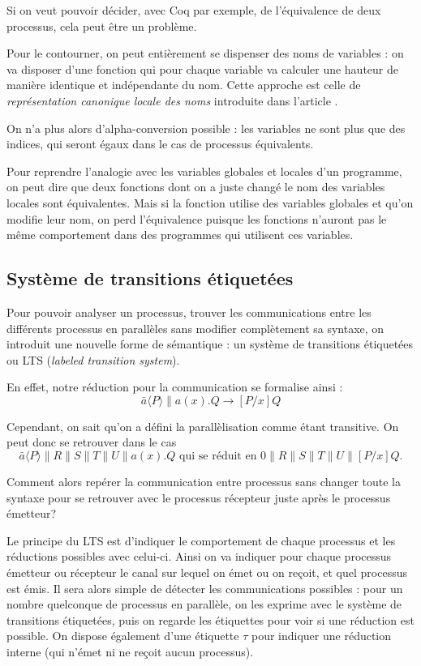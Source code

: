 \documentclass[11pt]{article}
\begin{document}
Si on veut pouvoir décider, avec Coq par exemple, de l'équivalence de deux processus, cela peut être un problème.

Pour le contourner, on peut entièrement se dispenser des noms de variables : on va disposer d'une fonction qui pour chaque variable va calculer une hauteur de manière identique et indépendante du nom. Cette approche est celle de \textit{représentation canonique locale des noms} introduite dans l'article \cite{canonical} .

On n'a plus alors d'alpha-conversion possible : les variables ne sont plus que des indices, qui seront égaux dans le cas de processus équivalents.

Pour reprendre l'analogie avec les variables globales et locales d'un programme, on peut dire que deux fonctions dont on a juste changé le nom des variables locales sont équivalentes. Mais si la fonction utilise des variables globales et qu'on modifie leur nom, on perd l'équivalence puisque les fonctions n'auront pas le même comportement dans des programmes qui utilisent ces variables.


\subsection{Système de transitions étiquetées} 
Pour pouvoir analyser un processus, trouver les communications entre les différents processus en parallèles sans modifier complètement sa syntaxe, on introduit une nouvelle forme de sémantique : un système de transitions étiquetées ou LTS (\textit{labeled transition system}).

En effet, notre réduction pour la communication se formalise ainsi :
$$\bar{a}\langle P\rangle\|a(x).Q \rightarrow [P/x]Q$$

Cependant, on sait qu'on a défini la parallèlisation comme étant transitive. On peut donc se retrouver dans le cas
$$\bar{a}\langle P\rangle\|R\|S\|T\|U\|a(x).Q \text{ qui se réduit en } 0\|R\|S\|T\|U\|[P/x]Q.$$

Comment alors repérer la communication entre processus sans changer toute la syntaxe pour se retrouver avec le processus récepteur juste après le processus émetteur?

Le principe du LTS est d'indiquer le comportement de chaque processus et les réductions possibles avec celui-ci. Ainsi on va indiquer pour chaque processus émetteur ou récepteur le canal sur lequel on émet ou on reçoit, et quel processus est émis. Il sera alors simple de détecter les communications possibles : pour un nombre quelconque de processus en parallèle, on les exprime avec le système de transitions étiquetées, puis on regarde les étiquettes pour voir si une réduction est possible. On dispose également d'une étiquette $\tau$ pour indiquer une réduction interne (qui n'émet ni ne reçoit aucun processus).
\end{document}
